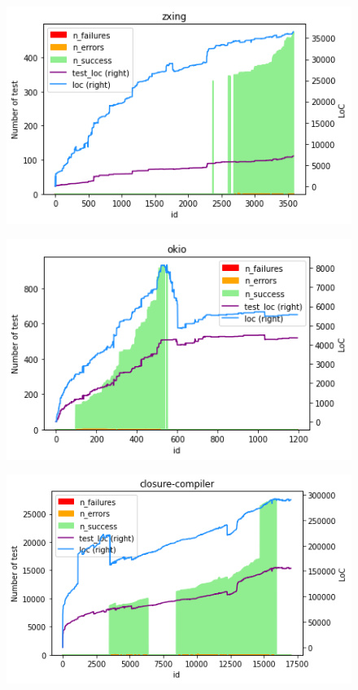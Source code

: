 \begin{figure}[!htb]
    \centering
    \begin{minipage}{.5\linewidth}
        \centering
        \includegraphics[width=\textwidth]{pages/02-Testability/images/projects/zxing.png}
        \label{fig:zxing}
    \end{minipage}%
    \begin{minipage}{.5\linewidth}
        \centering
        \includegraphics[width=\textwidth]{pages/02-Testability/images/projects/okio.png}
        \label{fig:okio}
    \end{minipage}
    \begin{minipage}{.5\linewidth}
        \centering
        \includegraphics[width=\textwidth]{pages/02-Testability/images/projects/closure.png}

\end{minipage}
\end{figure}
